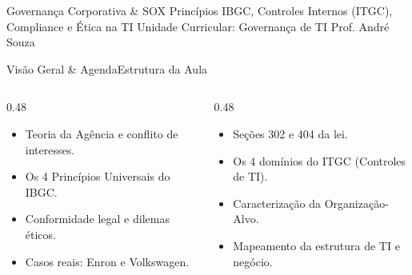 
\senaicover
  {Governança Corporativa \& SOX}
  {Princípios IBGC, Controles Internos (ITGC), Compliance e Ética na TI}
  {Unidade Curricular: Governança de TI}
  {Prof. André Souza}

\begin{senaiframe}{Visão Geral \& Agenda}{Estrutura da Aula}
  \begin{columns}[t]
    \begin{column}{0.48\textwidth}
      \begin{tcolorbox}[senaibluecard, title={1. Governança Corporativa}]
        \begin{itemize}
          \item Teoria da Agência e conflito de interesses.
          \item Os 4 Princípios Universais do IBGC.
        \end{itemize}
      \end{tcolorbox}
      \vspace{4pt}
      \begin{tcolorbox}[senaiambercard, title={3. Compliance \& Integridade}]
        \begin{itemize}
          \item Conformidade legal e dilemas éticos.
          \item Casos reais: Enron e Volkswagen.
        \end{itemize}
      \end{tcolorbox}
    \end{column}
    \begin{column}{0.48\textwidth}
      \begin{tcolorbox}[senairedcard, title={2. Lei Sarbanes-Oxley (SOX)}]
        \begin{itemize}
          \item Seções 302 e 404 da lei.
          \item Os 4 domínios do ITGC (Controles de TI).
        \end{itemize}
      \end{tcolorbox}
      \vspace{4pt}
      \begin{tcolorbox}[senaigreencard, title={4. Capítulo 1 do PDGTI}]
        \begin{itemize}
          \item Caracterização da Organização-Alvo.
          \item Mapeamento da estrutura de TI e negócio.
        \end{itemize}
      \end{tcolorbox}
    \end{column}
  \end{columns}
\end{senaiframe}

